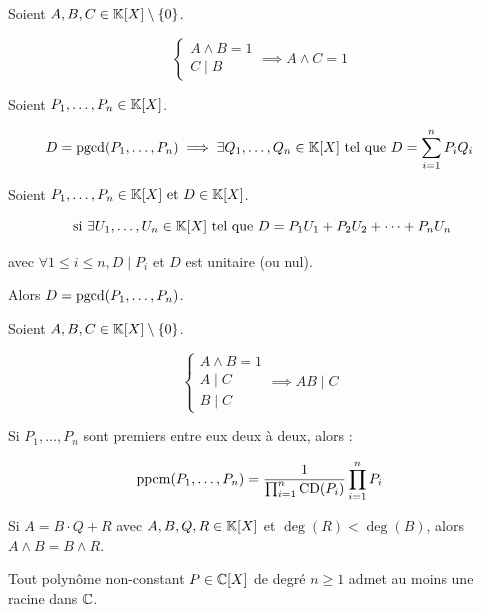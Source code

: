 \documentclass[12pt,a4paper]{report}
\begin{document}
\begin{property}
    Soient $A,B,C \in \mathbb{K}[X] \setminus \{0\}$.

    $$\begin{cases}
    A \wedge B = 1\\
    C \mid B
    \end{cases}
    \implies A \wedge C = 1$$
\end{property}

\begin{theorem}
    Soient $P_1,\dots,P_n \in \mathbb{K}[X]$.

    $$D = \mathrm{pgcd}(P_1,\dots,P_n) \implies \exists Q_1, \dots, Q_n \in \mathbb{K}[X] \text{ tel que } D = \sum_{i=1}^{n}P_iQ_i$$
\end{theorem}

\begin{property}
    Soient $P_1,\dots,P_n \in \mathbb{K}[X] \text{ et } D \in \mathbb{K}[X]$.

    $$\text{ si } \exists U_1,\dots,U_n \in \mathbb{K}[X] \text{ tel que } D = P_1U_1 + P_2U_2 + \cdots + P_nU_n$$

    avec $\forall 1 \le i \le n, D \mid P_i$ et $D$ est unitaire (ou nul).

    Alors $D = \mathrm{pgcd}(P_1,\dots,P_n)$.
\end{property}

\begin{theorem}
    Soient $A,B,C \in \mathbb{K}[X]\setminus\{0\}$.

    $$\begin{cases}
    A \wedge B = 1\\
    A \mid C\\
    B \mid C
    \end{cases}
    \implies AB \mid C$$
\end{theorem}

\begin{property}
    Si $P_1, \dots, P_n$ sont premiers entre eux deux à deux, alors :

    $$\mathrm{ppcm}(P_1,\dots,P_n) = \frac{1}{\prod_{i=1}^{n} \mathrm{CD}(P_i)} \prod_{i=1}^{n} P_i$$
\end{property}

\begin{theorem}
    Si $A = B\cdot Q + R$ avec $A,B,Q,R \in \mathbb{K}[X]$ et $\deg(R) < \deg(B)$, alors $A\wedge B = B\wedge R$.
\end{theorem}

\begin{theorem}
    Tout polynôme non-constant $P \in \mathbb{C}[X]$ de degré $n \ge 1$ admet au moins une racine dans $\mathbb{C}$.
\end{theorem}
\end{document}
